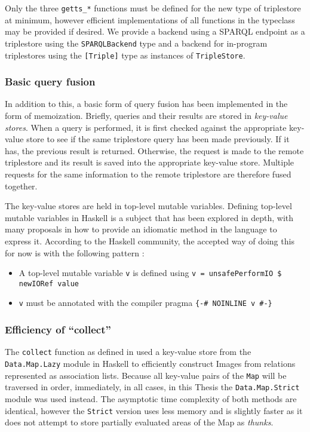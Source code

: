 \documentclass[../main.tex]{subfiles}
\begin{document}
Only the three \texttt{getts\_*} functions must be defined for the new type of triplestore at minimum, however efficient implementations
of all functions in the typeclass may be provided if desired.  We provide a backend using a SPARQL endpoint as a triplestore using the
\texttt{SPARQLBackend} type and a backend for in-program triplestores using the \texttt{[Triple]} type as instances of \texttt{TripleStore}.

\subsubsection{Basic query fusion}

In addition to this, a basic form of query fusion has been implemented in the form of memoization.  Briefly, queries and their results
are stored in {\em key-value stores}.  When a query is performed, it is first checked against the appropriate key-value store to see
if the same triplestore query has been made previously.  If it has, the previous result is returned.  Otherwise, the request is made to the remote
triplestore and its result is saved into the appropriate key-value store.  Multiple requests for the same information to the remote triplestore are therefore fused together.

The key-value stores are held in top-level mutable variables.  Defining top-level mutable variables in Haskell is a subject that has been explored in depth, with many proposals in how to provide an idiomatic method in the language to express it.  According to the Haskell community, the accepted way of doing this for now is with the following pattern \cite{tlmvconsensus}:

\begin{itemize}
	\item A top-level mutable variable \texttt{v} is defined using \texttt{v = unsafePerformIO \$ newIORef value} 
	\item \texttt{v} must be annotated with the compiler pragma \texttt{\{\--\# NOINLINE v \#\--\}}
\end{itemize}

\subsubsection{Efficiency of ``collect''}

The \texttt{collect} function as defined in \cite{agboola2015extensible} used a key-value store from the \texttt{Data.Map.Lazy} module in Haskell to efficiently construct Images from relations represented as association lists.  Because all key-value pairs of the \texttt{Map} will be traversed in order, immediately, in all cases, in this Thesis the \texttt{Data.Map.Strict} module was used instead.  The asymptotic time complexity of both methods are identical, however the \texttt{Strict} version uses less memory and is slightly faster as it does not attempt to store partially evaluated areas of the Map as {\em thunks}.
\end{document}
